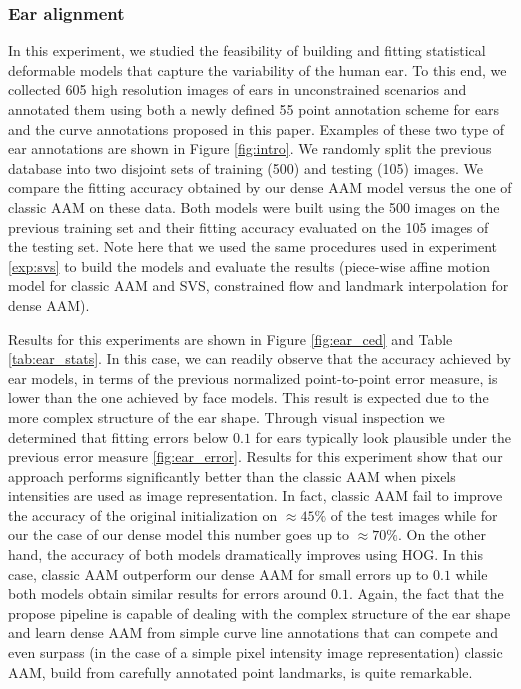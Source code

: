 \subsubsection{Ear alignment}
\label{exp:ear}

In this experiment, we studied the feasibility of building and fitting statistical deformable models that capture the variability of the human ear. To this end, we collected 605 high resolution images of ears in unconstrained scenarios and annotated them using both a newly defined 55 point annotation scheme for ears and the curve annotations proposed in this paper. Examples of these two type of ear annotations are shown in Figure \ref{fig:intro}. We randomly split the previous database into two disjoint sets of training (500) and testing (105) images. We compare the fitting accuracy obtained by our dense AAM model versus the one of classic AAM on these data. Both models were built using the 500 images on the previous training set and their fitting accuracy evaluated on the 105 images of the testing set. Note here that we used the same procedures used in experiment \ref{exp:svs} to build the models and evaluate the results (piece-wise affine motion model for classic AAM and SVS, constrained flow and landmark interpolation for dense AAM).

Results for this experiments are shown in Figure \ref{fig:ear_ced} and Table \ref{tab:ear_stats}. In this case, we can readily observe that the accuracy achieved by ear models, in terms of the previous normalized point-to-point error measure, is lower than the one achieved by face models. This result is expected due to the more complex structure of the ear shape. Through visual inspection we determined that fitting errors below $0.1$ for ears typically look plausible under the previous error measure \ref{fig:ear_error}. Results for this experiment show that our approach performs significantly better than the classic AAM when pixels intensities are used as image representation. In fact, classic AAM fail to improve the accuracy of the original initialization on $\approx45\%$ of the test images while for our the case of our dense model this number goes up to $\approx70\%$. On the other hand, the accuracy of both models dramatically improves using HOG. In this case, classic AAM outperform our dense AAM for small errors up to $0.1$ while both models obtain similar results for errors around $0.1$. Again, the fact that the propose pipeline is capable of dealing with the complex structure of the ear shape and learn dense AAM from simple curve line annotations that can compete and even surpass (in the case of a simple pixel intensity image representation) classic AAM, build from carefully annotated point landmarks, is quite remarkable. 

